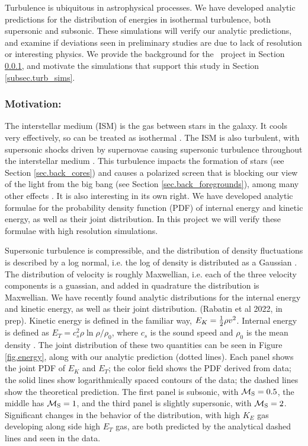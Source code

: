 Turbulence is ubiquitous in astrophysical processes.  We have developed analytic
predictions for the distribution of energies in isothermal turbulence, both
supersonic and subsonic. These simulations will verify our analytic predictions,
and examine if deviations seen in preliminary studies are due to lack of
resolution or interesting physics.
We provide the background for the \nameTurbulence\ project in Section
\ref{subsec.turb_motivate},
and motivate the simulations that support this study in Section
\ref{subsec.turb_sims}.


\subsubsection{Motivation: \nameTurbulence}
\label{subsec.turb_motivate}

The interstellar medium (ISM) is the gas between stars in the galaxy.  It cools
very effectively, so can be treated as isothermal \citep{Krumholz14}.  The ISM is also turbulent, with supersonic shocks driven by supernovae
causing supersonic turbulence throughout the interstellar medium
\citep{Elmegreen04}.  This
turbulence impacts the formation of stars (see Section \ref{sec.back_cores}) and
causes a polarized screen that is blocking our view of the light from the big bang (see
Section \ref{sec.back_foregrounds}), among many other effects
\citep{Elmegreen04}. It is also interesting in its own right.  We have developed
analytic formulae for the probability density function (PDF) of internal energy
and kinetic energy, as well as their joint distribution.  In this project we
will verify these formulae with high resolution simulations.

Supersonic turbulence is compressible, and the distribution of density
fluctuations is described by a log normal, i.e. the log of density is
distributed as a Gaussian \citep{Vazquez-Semadeni94}.  The distribution of velocity is roughly Maxwellian,
i.e. each of the three velocity components is a guassian, and added in quadrature the
distribution is Maxwellian.  
We have recently found analytic distributions for the internal energy and
kinetic energy, as well as their joint
distribution.   (Rabatin et al 2022, in prep). Kinetic energy is defined in the familiar way, $E_K=\frac{1}{2} \rho
v^2$.  Internal energy is defined as $E_T= c_s^2 \rho \ln \rho/\rho_0$, where
$c_s$ is the sound speed and $\rho_0$ is the mean density \citep{Banerjee18}.  The joint
distribution of these two quantities can be seen in Figure \ref{fig.energy},
along with our analytic prediction (dotted lines).
Each panel shows the joint PDF of $E_K$ and $E_T$;  the color field shows the
PDF derived from data; the solid lines show logarithmically spaced contours of
the data; the dashed lines show the theoretical prediction.  The first panel is
subsonic, with $\mathcal{M_{\rm{S}}}=0.5$, the middle has $\mathcal{M_{\rm{S}}}=1$, and the third panel is
slightly supersonic, with $\mathcal{M_{\rm{S}}}=2$.  Significant changes in the behavior of the
distribution, with high $K_E$ gas developing along side high $E_T$ gas, are both
predicted by the analytical dashed lines and seen in the data.


